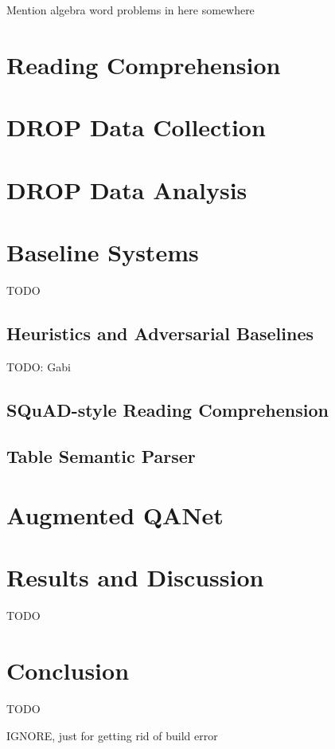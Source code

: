 \documentclass[11pt,a4paper]{article}
\begin{document}
Mention algebra word problems in here somewhere

\section{Reading Comprehension}


\section{DROP Data Collection}



\section{DROP Data Analysis}


\section{Baseline Systems}

TODO

\subsection{Heuristics and Adversarial Baselines}

TODO: Gabi

\subsection{SQuAD-style Reading Comprehension}




\subsection{Table Semantic Parser}


\section{Augmented QANet}


\section{Results and Discussion}

TODO

\section{Conclusion}

TODO

IGNORE, just for getting rid of build error\cite{Aho:72}


%



\end{document}
